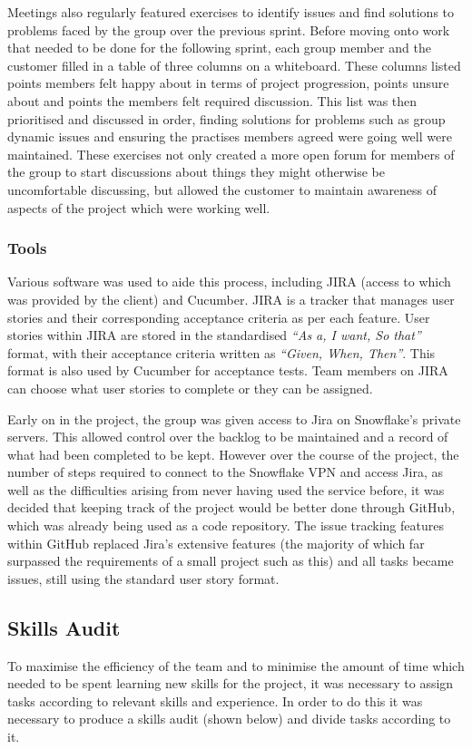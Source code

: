 \documentclass[a4paper, 12pt, twoside]{article}
\begin{document}
Meetings also regularly featured exercises to identify issues and find solutions to problems faced by the group over the previous sprint. Before moving onto work that needed to be done for the following sprint, each group member and the customer filled in a table of three columns on a whiteboard. These columns listed points members felt happy about in terms of project progression, points unsure about and points the members felt required discussion. This list was then prioritised and discussed in order, finding solutions for problems such as group dynamic issues and ensuring the practises members agreed were going well were maintained. These exercises not only created a more open forum for members of the group to start discussions about things they might otherwise be uncomfortable discussing, but allowed the customer to maintain awareness of aspects of the project which were working well.

\subsubsection{Tools}

Various software was used to aide this process, including JIRA (access to which was provided by the client) and Cucumber. JIRA is a tracker that manages user stories and their corresponding acceptance criteria as per each feature. User stories within JIRA are stored in the standardised \emph{``As a, I want, So that''} format, with their acceptance criteria written as \emph{``Given, When, Then''}. This format is also used by Cucumber for acceptance tests. Team members on JIRA can choose what user stories to complete or they can be assigned.

Early on in the project, the group was given access to Jira on Snowflake's private servers. This allowed control over the backlog to be maintained and a record of what had been completed to be kept. However over the course of the project, the number of steps required to connect to the Snowflake VPN and access Jira, as well as the difficulties arising from never having used the service before, it was decided that keeping track of the project would be better done through GitHub, which was already being used as a code repository. The issue tracking features within GitHub replaced Jira's extensive features (the majority of which far surpassed the requirements of a small project such as this) and all tasks became issues, still using the standard user story format.

\subsection{Skills Audit}
\label{sec:plan_skills_audit}
To maximise the efficiency of the team and to minimise the amount of time which needed to be spent learning new skills for the project, it was necessary to assign tasks according to relevant skills and experience. In order to do this it was necessary to produce a skills audit (shown below) and divide tasks according to it.
\end{document}
